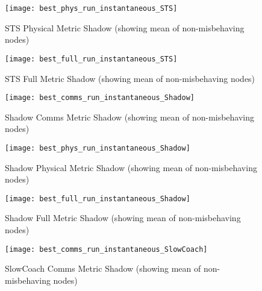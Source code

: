 \documentclass[aspectratio=43]{beamer}
\begin{document}
\begin{frame}\begin{figure}[h]
	\centering
	\texttt{[image: best\_phys\_run\_instantaneous\_STS]}
	\caption{STS Physical Metric Shadow (showing mean of non-misbehaving nodes)}
	\label{fig:phys_instantaneous_sts}
\end{figure}\end{frame}

\begin{frame}\begin{figure}[h]
	\centering
	\texttt{[image: best\_full\_run\_instantaneous\_STS]}
	\caption{STS Full Metric Shadow (showing mean of non-misbehaving nodes)}
	\label{fig:full_instantaneous_sts}
\end{figure}\end{frame}



\begin{frame}\begin{figure}[h]
	\centering
	\texttt{[image: best\_comms\_run\_instantaneous\_Shadow]}
	\caption{Shadow Comms Metric Shadow (showing mean of non-misbehaving nodes)}
	\label{fig:comms_instantaneous_shadow}
\end{figure}\end{frame}

\begin{frame}\begin{figure}[h]
	\centering
	\texttt{[image: best\_phys\_run\_instantaneous\_Shadow]}
	\caption{Shadow Physical Metric Shadow (showing mean of non-misbehaving nodes)}
	\label{fig:phys_instantaneous_shadow}
\end{figure}\end{frame}

\begin{frame}\begin{figure}[h]
	\centering
	\texttt{[image: best\_full\_run\_instantaneous\_Shadow]}
	\caption{Shadow Full Metric Shadow (showing mean of non-misbehaving nodes)}
	\label{fig:full_instantaneous_shadow}
\end{figure}\end{frame}



\begin{frame}\begin{figure}[h]
	\centering
	\texttt{[image: best\_comms\_run\_instantaneous\_SlowCoach]}
	\caption{SlowCoach Comms Metric Shadow (showing mean of non-misbehaving nodes)}
	\label{fig:comms_instantaneous_slowcoach}
\end{figure}\end{frame}
\end{document}
